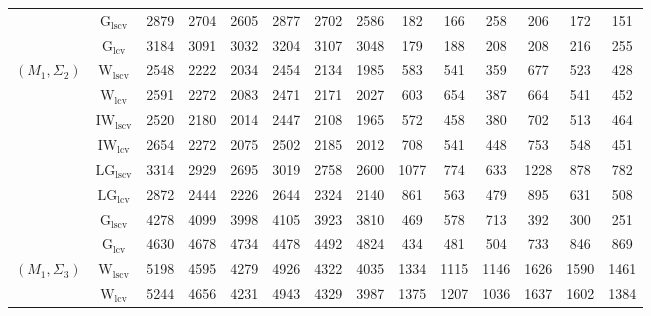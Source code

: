 \begin{table}[!ht]
{\begin{tabular}{@{}cc|ccc|ccc|ccc|ccc@{}}
 & $\mathrm{G}_{\mathrm{lscv}}$ & 2879 & 2704 & 2605 & 2877 & 2702 & 2586 & \cellcolor{black!10}182 & \cellcolor{black!30}166 & 258 & \cellcolor{black!30}206 & \cellcolor{black!30}172 & \cellcolor{black!30}151 \\ 
 & $\mathrm{G}_{\mathrm{lcv}}$ & 3184 & 3091 & 3032 & 3204 & 3107 & 3048 & \cellcolor{black!30}179 & \cellcolor{black!10}188 & \cellcolor{black!30}208 & \cellcolor{black!10}208 & \cellcolor{black!10}216 & \cellcolor{black!10}255 \\ 
\midrule
$(M_1,\Sigma_2)$ & $\mathrm{W}_{\mathrm{lscv}}$ & \cellcolor{black!10}2548 & \cellcolor{black!10}2222 & \cellcolor{black!10}2034 & \cellcolor{black!10}2454 & \cellcolor{black!10}2134 & \cellcolor{black!10}1985 & 583 & 541 & \cellcolor{black!30}359 & 677 & 523 & \cellcolor{black!10}428 \\ 
 & $\mathrm{W}_{\mathrm{lcv}}$ & 2591 & 2272 & 2083 & 2471 & 2171 & 2027 & 603 & 654 & 387 & \cellcolor{black!10}664 & 541 & 452 \\ 
 & $\mathrm{IW}_{\mathrm{lscv}}$ & \cellcolor{black!30}2520 & \cellcolor{black!30}2180 & \cellcolor{black!30}2014 & \cellcolor{black!30}2447 & \cellcolor{black!30}2108 & \cellcolor{black!30}1965 & 572 & \cellcolor{black!30}458 & \cellcolor{black!10}380 & 702 & \cellcolor{black!10}513 & 464 \\ 
 & $\mathrm{IW}_{\mathrm{lcv}}$ & 2654 & 2272 & 2075 & 2502 & 2185 & 2012 & 708 & 541 & 448 & 753 & 548 & 451 \\ 
 & $\mathrm{LG}_{\mathrm{lscv}}$ & 3314 & 2929 & 2695 & 3019 & 2758 & 2600 & 1077 & 774 & 633 & 1228 & 878 & 782 \\ 
 & $\mathrm{LG}_{\mathrm{lcv}}$ & 2872 & 2444 & 2226 & 2644 & 2324 & 2140 & 861 & 563 & 479 & 895 & 631 & 508 \\ 
 & $\mathrm{G}_{\mathrm{lscv}}$ & 4278 & 4099 & 3998 & 4105 & 3923 & 3810 & \cellcolor{black!10}469 & 578 & 713 & \cellcolor{black!30}392 & \cellcolor{black!30}300 & \cellcolor{black!30}251 \\ 
 & $\mathrm{G}_{\mathrm{lcv}}$ & 4630 & 4678 & 4734 & 4478 & 4492 & 4824 & \cellcolor{black!30}434 & \cellcolor{black!10}481 & 504 & 733 & 846 & 869 \\ 
\midrule
$(M_1,\Sigma_3)$ & $\mathrm{W}_{\mathrm{lscv}}$ & \cellcolor{black!10}5198 & 4595 & 4279 & 4926 & 4322 & 4035 & 1334 & 1115 & 1146 & 1626 & 1590 & 1461 \\ 
 & $\mathrm{W}_{\mathrm{lcv}}$ & 5244 & 4656 & 4231 & 4943 & 4329 & 3987 & 1375 & 1207 & 1036 & 1637 & 1602 & 1384 \\ 

\end{tabular}}
\end{table}
